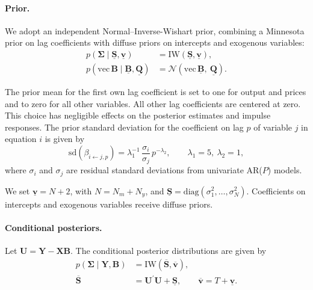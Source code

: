 \documentclass[\latexroot/\projectname]{subfiles}
\begin{document}
\paragraph{Prior.}
We adopt an independent Normal–Inverse-Wishart prior, combining a Minnesota prior on lag coefficients with diffuse priors on intercepts and exogenous variables:
\begin{align}
p(\boldsymbol{\Sigma}\mid \underline{\boldsymbol{S}},\underline{\boldsymbol{v}})
&= \mathrm{IW}(\underline{\boldsymbol{S}},\underline{\boldsymbol{v}}),\\
p\!\left(\mathrm{vec}\,\boldsymbol{B}\mid \underline{\boldsymbol{B}},\underline{\boldsymbol{Q}}\right)
&= \mathcal{N}\!\left(\mathrm{vec}\,\underline{\boldsymbol{B}},\ \underline{\boldsymbol{Q}}\right).
\end{align}

The prior mean for the first own lag coefficient is set to one for output and prices and to zero for all other variables. All other lag coefficients are centered at zero. This choice has negligible effects on the posterior estimates and impulse responses. The prior standard deviation for the coefficient on lag $p$ of variable $j$ in equation $i$ is given by
\[
\mathrm{sd}\!\left(\beta_{i\leftarrow j,p}\right)=\lambda_1^{-1}\,\frac{\sigma_i}{\sigma_j}\,p^{-\lambda_2},
\qquad \lambda_1=5,\ \lambda_2=1,
\]
where $\sigma_i$ and $\sigma_j$ are residual standard deviations from univariate AR($P$) models.

We set $\underline{\boldsymbol{v}} = N + 2$, with $N = N_m + N_y$, and $\underline{\boldsymbol{S}} = \mathrm{diag}(\sigma_1^2,\ldots,\sigma_N^2)$. Coefficients on intercepts and exogenous variables receive diffuse priors.

\paragraph{Conditional posteriors.}
Let $\boldsymbol{U} = \boldsymbol{Y} - \boldsymbol{X}\boldsymbol{B}$. The conditional posterior distributions are given by
\begin{align}
p(\boldsymbol{\Sigma}\mid \boldsymbol{Y}, \boldsymbol{B})
&= \mathrm{IW}(\overline{\boldsymbol{S}}, \overline{\boldsymbol{v}}),\\
\overline{\boldsymbol{S}}
&= \boldsymbol{U}^\prime \boldsymbol{U} + \underline{\boldsymbol{S}},\qquad
\overline{\boldsymbol{v}} = T + \underline{\boldsymbol{v}}.
\end{align}
\end{document}
